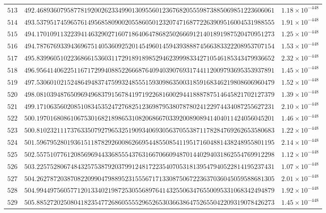 \documentclass[12pt,reqno]{amsart}
\theoremstyle{remark}
\begin{document}
\begin{longtable}{clc}
$513$ & $492.4689360795877819200262334990130955601236768205559873885069851223606061$ & $1.18\times 10^{-448}$ \\
$514$ & $493.5379517459657614956858090020558605012320747168772263909516004531988555$ & $1.91\times 10^{-448}$ \\
$515$ & $494.1701091132239414632902716071864064786825026669121401891987520470951273$ & $1.25\times 10^{-448}$ \\
$516$ & $494.7876769339436967514053609252014549601459439388874566383322208953707154$ & $1.53\times 10^{-448}$ \\
$517$ & $495.8399605102236866153603117291891898529462399983342710546185343479936652$ & $2.32\times 10^{-448}$ \\
$518$ & $496.9564140622511671729940885226668764094039076931744112009793695353937891$ & $1.45\times 10^{-448}$ \\
$519$ & $497.5306010215248649483747599324855515930986350031859168346219808606960479$ & $1.52\times 10^{-448}$ \\
$520$ & $498.0810394876509694968379156784197192268160029441888787514645821702127379$ & $1.39\times 10^{-448}$ \\
$521$ & $499.1710635602085108345352472768251236987953807878024122974434087255627231$ & $2.10\times 10^{-448}$ \\
$522$ & $500.1970168086106753016821898653108206866703392008908941404011424056045201$ & $1.46\times 10^{-448}$ \\
$523$ & $500.8102321117376335079279653251909340693056370553871178284769262653580683$ & $1.22\times 10^{-448}$ \\
$524$ & $501.5967952801936151187829260086266954485508541195171604881438248955801195$ & $2.14\times 10^{-448}$ \\
$525$ & $502.5575107761208569694433685554376316670660948701440294031862554769912298$ & $1.12\times 10^{-448}$ \\
$526$ & $503.2257528067484325753879203799124817223540705318139547940522814195237431$ & $1.07\times 10^{-448}$ \\
$527$ & $504.2627872038708220990479889523155567171330875067223637036045059588681305$ & $2.01\times 10^{-448}$ \\
$528$ & $504.9944975605771201334021987253055689764143255063476550095331068342494879$ & $1.92\times 10^{-448}$ \\
$529$ & $505.8852720250804182354772686055552965265303663864752655042209319078426273$ & $1.45\times 10^{-448}$ \\

\end{longtable}
\end{document}
